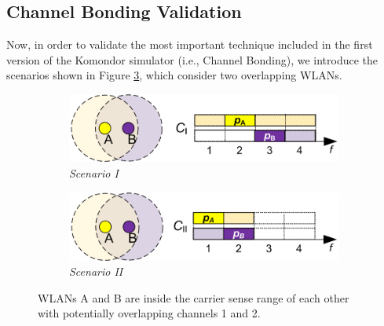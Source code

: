 \documentclass[a4paper]{article}
\begin{document}
	\subsection{Channel Bonding Validation}
	\label{section:validations_channel_bonding}
	Now, in order to validate the most important technique included in the first version of the Komondor simulator (i.e., Channel Bonding), we introduce the scenarios shown in Figure \ref{fig:cb_scenarios}, which consider two overlapping WLANs.
	\begin{figure}[h!]
		\centering
		\begin{subfigure}[b]{0.475\textwidth}
			\includegraphics[width=1\textwidth]{images/scenario_I.png}
			\caption{\textit{Scenario I}}
			\label{fig:scenario_I}
		\end{subfigure}
		\begin{subfigure}[b]{0.475\textwidth}
			\includegraphics[width=1\textwidth]{images/scenario_II.png}
			\caption{\textit{Scenario II}}
			\label{fig:scenario_II}
		\end{subfigure}
		\caption{WLANs A and B are inside the carrier sense range of each other with potentially overlapping channels 1 and 2.}
		\label{fig:cb_scenarios}
	\end{figure}
	
\end{document}

